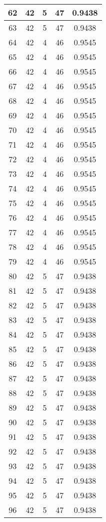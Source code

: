 \documentclass[letterpaper, 12pt]{article}
\begin{document}
\begin{longtable}{|c|c|c|c|c|}
\hline
62 & 42 & 5 & 47 & 0.9438 \\
\hline
63 & 42 & 5 & 47 & 0.9438 \\
\hline
64 & 42 & 4 & 46 & 0.9545 \\
\hline
65 & 42 & 4 & 46 & 0.9545 \\
\hline
66 & 42 & 4 & 46 & 0.9545 \\
\hline
67 & 42 & 4 & 46 & 0.9545 \\
\hline
68 & 42 & 4 & 46 & 0.9545 \\
\hline
69 & 42 & 4 & 46 & 0.9545 \\
\hline
70 & 42 & 4 & 46 & 0.9545 \\
\hline
71 & 42 & 4 & 46 & 0.9545 \\
\hline
72 & 42 & 4 & 46 & 0.9545 \\
\hline
73 & 42 & 4 & 46 & 0.9545 \\
\hline
74 & 42 & 4 & 46 & 0.9545 \\
\hline
75 & 42 & 4 & 46 & 0.9545 \\
\hline
76 & 42 & 4 & 46 & 0.9545 \\
\hline
77 & 42 & 4 & 46 & 0.9545 \\
\hline
78 & 42 & 4 & 46 & 0.9545 \\
\hline
79 & 42 & 4 & 46 & 0.9545 \\
\hline
80 & 42 & 5 & 47 & 0.9438 \\
\hline
81 & 42 & 5 & 47 & 0.9438 \\
\hline
82 & 42 & 5 & 47 & 0.9438 \\
\hline
83 & 42 & 5 & 47 & 0.9438 \\
\hline
84 & 42 & 5 & 47 & 0.9438 \\
\hline
85 & 42 & 5 & 47 & 0.9438 \\
\hline
86 & 42 & 5 & 47 & 0.9438 \\
\hline
87 & 42 & 5 & 47 & 0.9438 \\
\hline
88 & 42 & 5 & 47 & 0.9438 \\
\hline
89 & 42 & 5 & 47 & 0.9438 \\
\hline
90 & 42 & 5 & 47 & 0.9438 \\
\hline
91 & 42 & 5 & 47 & 0.9438 \\
\hline
92 & 42 & 5 & 47 & 0.9438 \\
\hline
93 & 42 & 5 & 47 & 0.9438 \\
\hline
94 & 42 & 5 & 47 & 0.9438 \\
\hline
95 & 42 & 5 & 47 & 0.9438 \\
\hline
96 & 42 & 5 & 47 & 0.9438 \\

\end{longtable}
\end{document}
